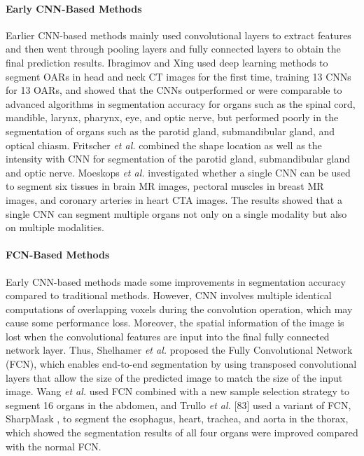 \documentclass[lettersize,journal]{IEEEtran}
\begin{document}
\paragraph{Early CNN-Based Methods}
Earlier CNN-based methods mainly used convolutional layers to extract features and then went through pooling layers and fully connected layers to obtain the final prediction results. Ibragimov and Xing \cite{37} used deep learning methods to segment OARs in head and neck CT images for the first time, training 13 CNNs for 13 OARs, and showed that the CNNs outperformed or were comparable to advanced algorithms in segmentation accuracy for organs such as the spinal cord, mandible, larynx, pharynx, eye, and optic nerve, but performed poorly in the segmentation of organs such as the parotid gland, submandibular gland, and optical chiasm. Fritscher {\it{et al.}} \cite{38} combined the shape location as well as the intensity with CNN for segmentation of the parotid gland, submandibular gland and optic nerve. Moeskops {\it{et al.}} \cite{95} investigated whether a single CNN can be used to segment six tissues in brain MR images, pectoral muscles in breast MR images, and coronary arteries in heart CTA images. The results showed that a single CNN can segment multiple organs not only on a single modality but also on multiple modalities.

\paragraph{FCN-Based Methods}
Early CNN-based methods made some improvements in segmentation accuracy compared to traditional methods. However, CNN involves multiple identical computations of overlapping voxels during the convolution operation, which may cause some performance loss. Moreover, the spatial information of the image is lost when the convolutional features are input into the final fully connected network layer. Thus, Shelhamer {\it{et al.}} \cite{96} proposed the Fully Convolutional Network (FCN), which enables end-to-end segmentation by using transposed convolutional layers that allow the size of the predicted image to match the size of the input image. Wang {\it{et al.}} \cite{97} used FCN combined with a new sample selection strategy to segment 16 organs in the abdomen, and Trullo {\it{et al.}} [83] used a variant of FCN, SharpMask \cite{98}, to segment the esophagus, heart, trachea, and aorta in the thorax, which showed the segmentation results of all four organs were improved compared with the normal FCN.
\end{document}
